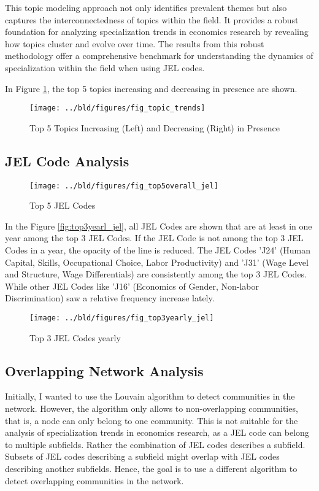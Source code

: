 \documentclass[11pt, a4paper, leqno]{article}
\begin{document}
This topic modeling approach not only identifies prevalent themes but also captures the interconnectedness of topics within the field.
It provides a robust foundation for analyzing specialization trends in economics research by revealing how topics cluster and evolve over time.
The results from this robust methodology offer a comprehensive benchmark for understanding the dynamics of specialization within the field when using JEL codes.

In Figure \ref{fig:top5_increasing_decreasing_topics}, the top 5 topics increasing and decreasing in presence are shown.


\begin{figure}
    \centering
    \texttt{[image: ../bld/figures/fig\_topic\_trends]}
    \caption{Top 5 Topics Increasing (Left) and Decreasing (Right) in Presence}
    \label{fig:top5_increasing_decreasing_topics}
\end{figure}

\subsection{JEL Code Analysis}

\begin{figure}
    \centering
    \texttt{[image: ../bld/figures/fig\_top5overall\_jel]}
    \caption{Top 5 JEL Codes}
    \label{fig:top5overall_jel}
\end{figure}

In the Figure \ref{fig:top3yearl_jel}, all JEL Codes are shown that are at least in one year among the top 3 JEL Codes.
If the JEL Code is not among the top 3 JEL Codes in a year, the opacity of the line is reduced.
The JEL Codes 'J24' (Human Capital, Skills, Occupational Choice, Labor Productivity) and 'J31' (Wage Level and Structure, Wage Differentials) are consistently among the top 3 JEL Codes.
While other JEL Codes like 'J16' (Economics of Gender, Non-labor Discrimination) saw a relative frequency increase lately.

\begin{figure}
    \centering
    \texttt{[image: ../bld/figures/fig\_top3yearly\_jel]}
    \caption{Top 3 JEL Codes yearly}
    \label{fig:top3yearly_jel}
\end{figure}

\subsection{Overlapping Network Analysis}
Initially, I wanted to use the Louvain algorithm to detect communities in the network.
However, the algorithm only allows to non-overlapping communities, that is, a node can only belong to one community.
This is not suitable for the analysis of specialization trends in economics research, as a JEL code can belong to multiple subfields.
Rather the combination of JEL codes describes a subfield.
Subsets of JEL codes describing a subfield might overlap with JEL codes describing another subfields.
Hence, the goal is to use a different algorithm to detect overlapping communities in the network.
\end{document}
